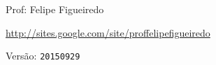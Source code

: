 \documentclass[a4paper]{article}
\begin{document}
\parbox[c]{.825\textwidth}{\raggedright%
{Prof: Felipe Figueiredo\par}
{\url{http://sites.google.com/site/proffelipefigueiredo}\par}
}

Versão: \verb|20150929|













\end{document}
